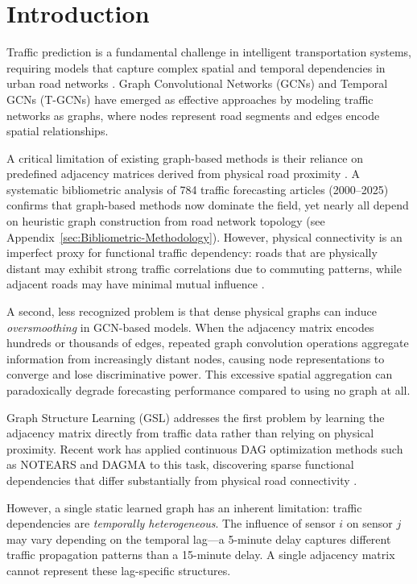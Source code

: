 \section{Introduction}\label{sec:introduction}

Traffic prediction is a fundamental challenge in intelligent transportation systems, requiring models that capture complex spatial and temporal dependencies in urban road networks \citep{akhtar2021review}. Graph Convolutional Networks (GCNs) \citep{kipf2017semi} and Temporal GCNs (T-GCNs) \citep{zhao2019t} have emerged as effective approaches by modeling traffic networks as graphs, where nodes represent road segments and edges encode spatial relationships.

A critical limitation of existing graph-based methods is their reliance on predefined adjacency matrices derived from physical road proximity \citep{zhao2019t}. A systematic bibliometric analysis of 784 traffic forecasting articles (2000--2025) confirms that graph-based methods now dominate the field, yet nearly all depend on heuristic graph construction from road network topology (see Appendix~\ref{sec:Bibliometric-Methodology}). However, physical connectivity is an imperfect proxy for functional traffic dependency: roads that are physically distant may exhibit strong traffic correlations due to commuting patterns, while adjacent roads may have minimal mutual influence \citep{Chen2022}.

A second, less recognized problem is that dense physical graphs can induce \textit{oversmoothing} in GCN-based models. When the adjacency matrix encodes hundreds or thousands of edges, repeated graph convolution operations aggregate information from increasingly distant nodes, causing node representations to converge and lose discriminative power. This excessive spatial aggregation can paradoxically degrade forecasting performance compared to using no graph at all.

Graph Structure Learning (GSL) addresses the first problem by learning the adjacency matrix directly from traffic data rather than relying on physical proximity. Recent work has applied continuous DAG optimization methods such as NOTEARS \citep{zheng2018dags} and DAGMA \citep{Bello2024DAGMA} to this task, discovering sparse functional dependencies that differ substantially from physical road connectivity \citep{Amintoosi1403aimc55-GSL}.

However, a single static learned graph has an inherent limitation: traffic dependencies are \textit{temporally heterogeneous}. The influence of sensor $i$ on sensor $j$ may vary depending on the temporal lag---a 5-minute delay captures different traffic propagation patterns than a 15-minute delay. A single adjacency matrix cannot represent these lag-specific structures.


